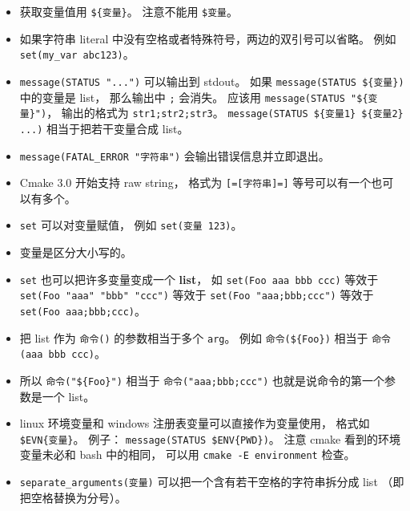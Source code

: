 \begin{itemize}
\item 获取变量值用 \verb`${变量}`。 注意不能用 \verb`$变量`。
\item 如果字符串 literal 中没有空格或者特殊符号，两边的双引号可以省略。 例如 \verb`set(my_var abc123)`。
\item \verb`message(STATUS "...")` 可以输出到 stdout。 如果 \verb`message(STATUS ${变量})` 中的变量是 list， 那么输出中 \verb`;` 会消失。 应该用 \verb`message(STATUS "${变量}")`， 输出的格式为 \verb`str1;str2;str3`。 \verb`message(STATUS ${变量1} ${变量2} ...)` 相当于把若干变量合成 list。
\item \verb`message(FATAL_ERROR "字符串")` 会输出错误信息并立即退出。
\item Cmake 3.0 开始支持 raw string， 格式为 \verb`[=[字符串]=]` 等号可以有一个也可以有多个。
\item \verb`set` 可以对变量赋值， 例如 \verb`set(变量 123)`。
\item 变量是区分大小写的。
\item \verb`set` 也可以把许多变量变成一个 \textbf{list}， 如 \verb`set(Foo aaa bbb ccc)` 等效于 \verb`set(Foo "aaa" "bbb" "ccc")` 等效于 \verb`set(Foo "aaa;bbb;ccc")` 等效于 \verb`set(Foo aaa;bbb;ccc)`。
\item 把 list 作为 \verb`命令()` 的参数相当于多个 \verb`arg`。 例如 \verb`命令(${Foo})` 相当于 \verb`命令(aaa bbb ccc)`。
\item 所以 \verb`命令("${Foo}")` 相当于 \verb`命令("aaa;bbb;ccc")` 也就是说命令的第一个参数是一个 list。
\item linux 环境变量和 windows 注册表变量可以直接作为变量使用， 格式如 \verb`$EVN{变量}`。 例子： \verb`message(STATUS $ENV{PWD})`。 注意 cmake 看到的环境变量未必和 bash 中的相同， 可以用 \verb`cmake -E environment` 检查。
\item \verb`separate_arguments(变量)` 可以把一个含有若干空格的字符串拆分成 list （即把空格替换为分号）。
\end{itemize}

